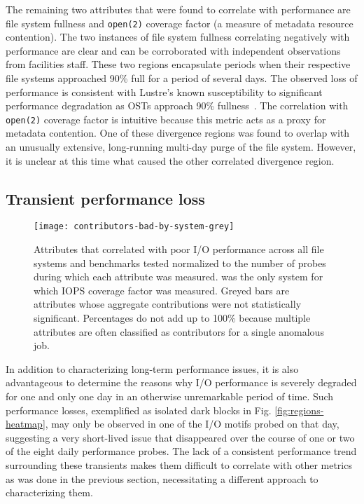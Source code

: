 The remaining two attributes that were found to correlate with performance
are file system fullness and \texttt{open(2)} coverage factor (a
measure of metadata resource contention).  The two instances of file
system fullness correlating negatively with performance are clear
and can be corroborated with independent observations from facilities
staff.  These two regions encapsulate periods when their respective
file systems approached 90\% full for a period of several days.
The observed loss of performance is consistent with Lustre's known
susceptibility to significant performance degradation as OSTs approach
90\% fullness~\cite{oral2014best,Lockwood2017}.  The correlation with
\texttt{open(2)} coverage factor is intuitive because this metric acts as a
proxy for metadata contention.  
One of these divergence regions was found to overlap with an unusually extensive, long-running multi-day purge of the \edison \scratchtwo file system.
However, it is unclear at this time what caused the other correlated divergence region.


\subsection{Transient performance loss} \label{sec:results/shortterm}

\begin{figure}

    \centering
    \texttt{[image: contributors-bad-by-system-grey]}
    \vspace{-.35in}
    \caption{Attributes that correlated with poor I/O performance across all file systems and benchmarks tested normalized to the number of probes during which each attribute was measured.
    \mira was the only system for which IOPS coverage factor was measured.
    Greyed bars are attributes whose aggregate contributions were not statistically significant.
    Percentages do not add up to 100\% because multiple attributes are often classified as contributors for a single anomalous job.
    }
    \label{fig:contributors-bad-by-system}
\end{figure}

In addition to characterizing long-term performance issues, it is also advantageous to determine the reasons why I/O performance is severely degraded for one and only one day in an otherwise unremarkable period of time.
Such performance losses, exemplified as isolated dark blocks in Fig. \ref{fig:regions-heatmap}, may only be observed in one of the I/O motifs probed on that day, suggesting a very short-lived issue that disappeared over the course of one or two of the eight daily performance probes.
The lack of a consistent performance trend surrounding these transients makes them difficult to correlate with other metrics as was done in the previous section, necessitating a different approach to characterizing them.

